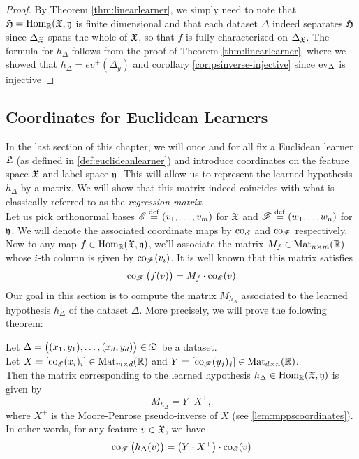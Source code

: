 \begin{proof}
By Theorem \ref{thm:linearlearner}, we simply need to note that $\mathfrak{H}=\operatorname{Hom}_{\mathbb{R}}(\mathfrak{X},\mathfrak{y}$ is finite dimensional and that each dataset $\Delta$ indeed separates $\mathfrak{H}$ since $\Delta_{\mathfrak{X}}$ spans the whole of $\mathfrak{X}$, so that $f$ is fully characterized on $\Delta_{\mathfrak{X}}$. The formula for $h_\Delta$ follows from the proof of Theorem \ref{thm:linearlearner}, where we showed that $h_\Delta=ev^+(\Delta_y)$ and corollary \ref{cor:psinverse-injective} since $\operatorname{ev}_\Delta$ is injective
\end{proof}



\subsection{Coordinates for Euclidean Learners} In the last section of this chapter, we will once and for all fix a Euclidean learner $\mathfrak{L}$ (as defined in \ref{def:euclideanlearner}) and introduce coordinates on the feature space $\mathfrak{X}$ and label space $\mathfrak{y}$. This will allow us to represent the learned hypothesis $h_\Delta$ by a matrix. We will show that this matrix indeed coincides with what is classically referred to as the \emph{regression matrix}.\\
Let us pick orthonormal bases $\r{E}\define (v_1,\ldots ,v_m)$ for $\mathfrak{X}$ and $\r{F}\define (w_1,\ldots w_n)$ for $\mathfrak{y}$. We will denote the associated coordinate maps by $\co_\r{E}$ and $\co_\r{F}$ respectively.\\
Now to any map $f \in \operatorname{Hom}_{\mathbb{R}}(\mathfrak{X},\mathfrak{y})$, we'll associate the matrix $M_f\in \operatorname{Mat}_{n\times m}(\mathbb{R})$ whose $i$-th column is given by $\co_\r{F}(v_i)$. It is well known that this matrix satisfies
\[ \co_{\r{F}}\big(f(v)\big) = M_f\cdot \co_{\r{E}}(v) \]
Our goal in this section is to compute the matrix $M_{h_\Delta}$ associated to the learned hypothesis $h_\Delta$ of the dataset $\Delta$. More precisely, we will prove the following theorem:
\begin{theorem}\label{thm:regressionwithcoordinates}
	 Let $\Delta=\big((x_1,y_1),\ldots ,(x_d,y_d)\big) \in \mathfrak{D}$ be a dataset.\\ Let $X = [\co_{\r{E}}(x_i)_i] \in \Mat_{m\times d}(\d{R})$ and $Y = [\co_{\r{F}}(y_j)_j]\in \Mat_{d \times n}(\d{R})$.\\ 
	 Then the matrix corresponding to the learned hypothesis $h_\Delta \in \operatorname{Hom}_{\mathbb{R}}(\mathfrak{X},\mathfrak{y})$ is given by \[M_{h_\Delta} = Y\cdot X^+,\] where $X^+$ is the Moore-Penrose pseudo-inverse of $X$ (see \ref{lem:mppscoordinates}).\\ 
	 In other words, for any feature $v \in \mathfrak{X}$, we have\[
	\co_{\r{F}}\big(h_\Delta(v)\big) =\big( Y\cdot X^+ \big) \cdot \co_\r{E}(v)
	\]
\end{theorem}

